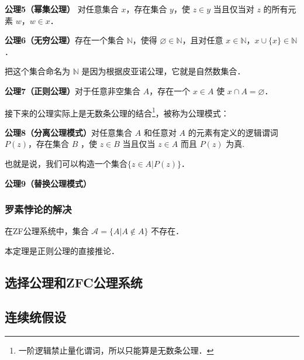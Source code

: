 \textbf{公理5（幂集公理）} 对任意集合 $x$，存在集合 $y$，使 $z\in y$ 当且仅当对 $z$ 的所有元素 $w$，$w\in x$．

\textbf{公理6（无穷公理）}存在一个集合 $\mathbb{N}$，使得 $\varnothing\in\mathbb{N}$，且对任意 $x\in \mathbb{N}$，$x\cup\{x\}\in\mathbb{N}$．

把这个集合命名为 $\mathbb{N}$ 是因为根据皮亚诺公理，它就是自然数集合．

\textbf{公理7（正则公理）}对于任意非空集合 $A$，存在一个 $x\in A$ 使 $x\cap A=\varnothing$．

接下来的公理实际上是无数条公理的结合\footnote{一阶逻辑禁止量化谓词，所以只能算是无数条公理．}，被称为公理模式：

\textbf{公理8（分离公理模式）}对任意集合 $A$ 和任意对 $A$ 的元素有定义的逻辑谓词 $P(z)$，存在集合 $B$ ，使 $z\in B$ 当且仅当 $z\in A$ 而且 $P(z)$ 为真.

也就是说，我们可以构造一个集合$\{z\in A | P(z)\}$．

\textbf{公理9（替换公理模式）}

\subsubsection{罗素悖论的解决}
\begin{theorem}{}
在ZF公理系统中，集合 $\mathcal{A}=\{A|A\notin A\}$ 不存在．
\end{theorem}

本定理是正则公理的直接推论．


\subsection{选择公理和ZFC公理系统}

\subsection{连续统假设}



